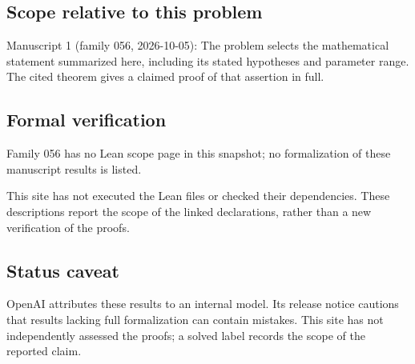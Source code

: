 \documentclass[11pt]{article}
\begin{document}
\subsection{Scope relative to this problem}
Manuscript 1 (family 056, 2026-10-05): The problem selects the mathematical statement summarized here, including its stated hypotheses and parameter range. The cited theorem gives a claimed proof of that assertion in full.

\subsection{Formal verification}
Family 056 has no Lean scope page in this snapshot; no formalization of these manuscript results is listed.

This site has not executed the Lean files or checked their dependencies. These descriptions report the scope of the linked declarations, rather than a new verification of the proofs.

\subsection{Status caveat}
OpenAI attributes these results to an internal model. Its release notice cautions that results lacking full formalization can contain mistakes. This site has not independently assessed the proofs; a solved label records the scope of the reported claim.
\end{document}
